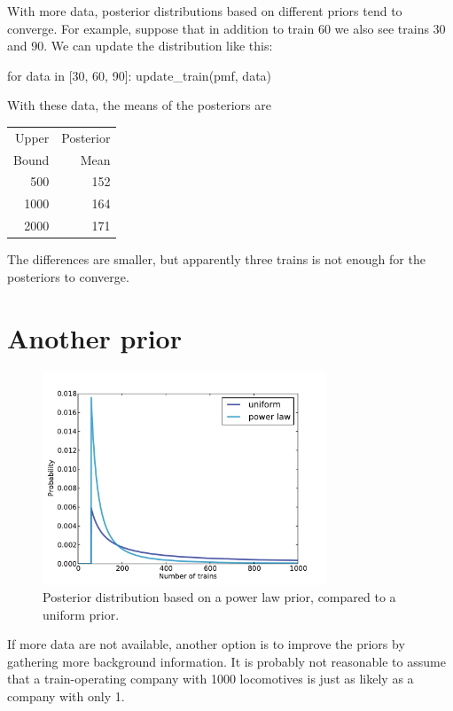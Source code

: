 \documentclass[12pt]{book}
\theoremstyle{exercise}
\begin{document}
With more data, posterior distributions based on different
priors tend to converge.  
For example, suppose that in addition
to train 60 we also see trains 30 and 90.  
We can update the distribution like this:

\begin{code}
for data in [30, 60, 90]:
    update_train(pmf, data)
\end{code}

With these data, the means of the posteriors are

\begin{tabular}{r r}
\toprule
Upper & Posterior \\
Bound & Mean \\
\midrule
500 & 152 \\
1000 & 164\\
2000 & 171\\
\bottomrule
\end{tabular}

The differences are smaller, but apparently three trains is not enough for the posteriors to converge.


\section{Another prior}

\begin{figure}
\centerline{\includegraphics[height=2.5in]{figs/train4.pdf}}
\caption{Posterior distribution based on a power law prior,
compared to a uniform prior.}
\label{fig.train4}
\end{figure}

If more data are not available, another option is to improve the
priors by gathering more background information.  
It is probably not reasonable to assume that a train-operating company with 1000 locomotives is just as likely as a company with only 1.
\end{document}

